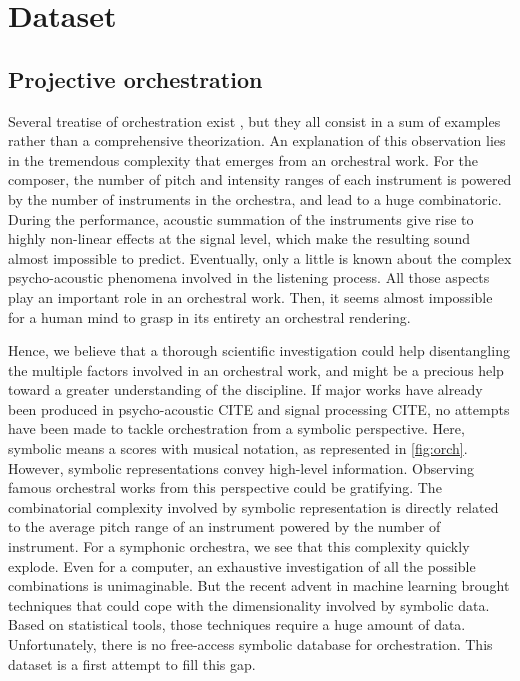 \documentclass[twoside,twocolumn]{article}
\begin{document}
\section{Dataset}
\subsection{Projective orchestration}
Several treatise of orchestration exist \cite{koechli_orch,piston-orch,Rimsky-Korsakov:1873aa}, but they all consist in a sum of examples rather than a comprehensive theorization.
An explanation of this observation lies in the tremendous complexity that emerges from an orchestral work. For the composer, the number of pitch and intensity ranges of each instrument is powered by the number of instruments in the orchestra, and lead to a huge combinatoric. During the performance, acoustic summation of the instruments give rise to highly non-linear effects at the signal level, which make the resulting sound almost impossible to predict. Eventually, only a little is known about the complex psycho-acoustic phenomena involved in the listening process. All those aspects play an important role in an orchestral work. Then, it seems almost impossible for a human mind to grasp in its entirety an orchestral rendering.

Hence, we believe that a thorough scientific investigation could help disentangling the multiple factors involved in an orchestral work, and might be a precious help toward a greater understanding of the discipline.
If major works have already been produced in psycho-acoustic CITE and signal processing CITE, no attempts have been made to tackle orchestration from a symbolic perspective.
Here, symbolic means a scores with musical notation, as represented in \ref{fig:orch}.
However, symbolic representations convey high-level information. Observing famous orchestral works from this perspective could be gratifying.
The combinatorial complexity involved by symbolic representation is directly related to the average pitch range of an instrument powered by the number of instrument. For a symphonic orchestra, we see that this complexity quickly explode. Even for a computer, an exhaustive investigation of all the possible combinations is unimaginable.
But the recent advent in machine learning brought techniques that could cope with the dimensionality involved by symbolic data.
Based on statistical tools, those techniques require a huge amount of data. Unfortunately, there is no free-access symbolic database for orchestration.
This dataset is a first attempt to fill this gap.
\end{document}
